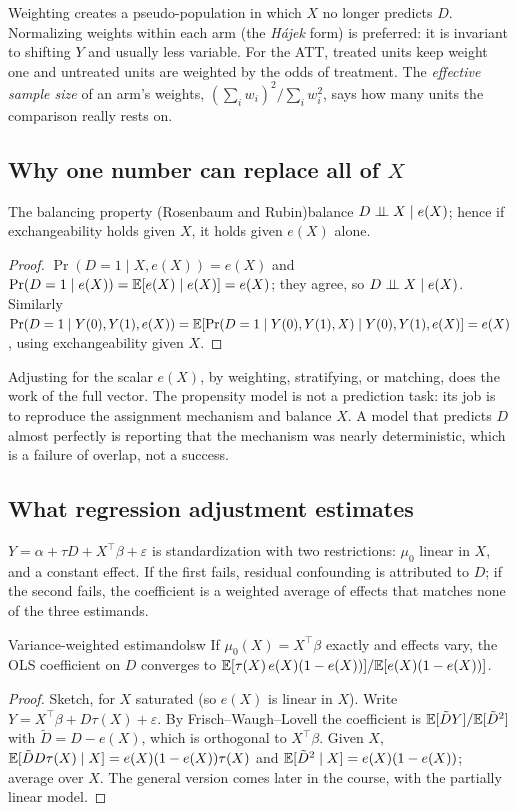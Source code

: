 \documentclass[11pt]{article}
\begin{document}
Weighting creates a pseudo-population in which $X$ no longer predicts $D$. Normalizing weights within each arm (the
\emph{H\'ajek} form) is preferred: it is invariant to shifting $Y$ and usually less variable. For the ATT, treated units keep
weight one and untreated units are weighted by the odds of treatment. The \emph{effective sample size} of an arm's weights,
$(\sum_i w_i)^2/\sum_i w_i^2$, says how many units the comparison really rests on.

\subsection{Why one number can replace all of \texorpdfstring{$X$}{X}}

\begin{prop}{The balancing property (Rosenbaum and Rubin)}{balance}
$D \perp\!\!\!\perp X \mid e(X)$; hence if exchangeability holds given $X$, it holds given $e(X)$ alone.
\end{prop}
\begin{proof}
$\Pr(D=1 \mid X, e(X)) = e(X)$ and $\Pr(D=1 \mid e(X)) = \mathbb{E}[e(X) \mid e(X)] = e(X)$; they agree, so $D \perp\!\!\!\perp X \mid e(X)$. Similarly
$\Pr(D=1 \mid Y(0), Y(1), e(X)) = \mathbb{E}[\Pr(D=1 \mid Y(0), Y(1), X) \mid Y(0), Y(1), e(X)] = e(X)$, using exchangeability given $X$.
\end{proof}

Adjusting for the scalar $e(X)$, by weighting, stratifying, or matching, does the work of the full vector. The propensity model
is not a prediction task: its job is to reproduce the assignment mechanism and balance $X$. A model that predicts $D$ almost
perfectly is reporting that the mechanism was nearly deterministic, which is a failure of overlap, not a success.

\subsection{What regression adjustment estimates}

$Y = \alpha + \tau D + X^\top\beta + \varepsilon$ is standardization with two restrictions: $\mu_0$ linear in $X$, and a constant
effect. If the first fails, residual confounding is attributed to $D$; if the second fails, the coefficient is a weighted
average of effects that matches none of the three estimands.

\begin{prop}{Variance-weighted estimand}{olsw}
If $\mu_0(X) = X^\top\beta$ exactly and effects vary, the OLS coefficient on $D$ converges to
$\mathbb{E}[\tau(X)\,e(X)(1-e(X))]/\mathbb{E}[e(X)(1-e(X))]$.
\end{prop}
\begin{proof}
Sketch, for $X$ saturated (so $e(X)$ is linear in $X$). Write $Y = X^\top\beta + D\tau(X) + \varepsilon$. By
Frisch--Waugh--Lovell the coefficient is $\mathbb{E}[\tilde D Y]/\mathbb{E}[\tilde D^2]$ with $\tilde D = D - e(X)$, which is orthogonal to $X^\top\beta$.
Given $X$, $\mathbb{E}[\tilde D D\tau(X) \mid X] = e(X)(1-e(X))\tau(X)$ and $\mathbb{E}[\tilde D^2 \mid X] = e(X)(1-e(X))$; average over $X$. The general version
comes later in the course, with the partially linear model.
\end{proof}
\end{document}
